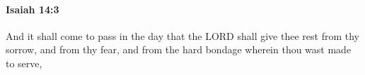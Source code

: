 
		\paragraph{Isaiah 14:3} %
			\label{ISAIAH-14-3}

			And it shall come to pass in the day that the LORD shall give thee rest from thy sorrow, and from thy fear, and from the hard bondage wherein thou wast made to serve,


